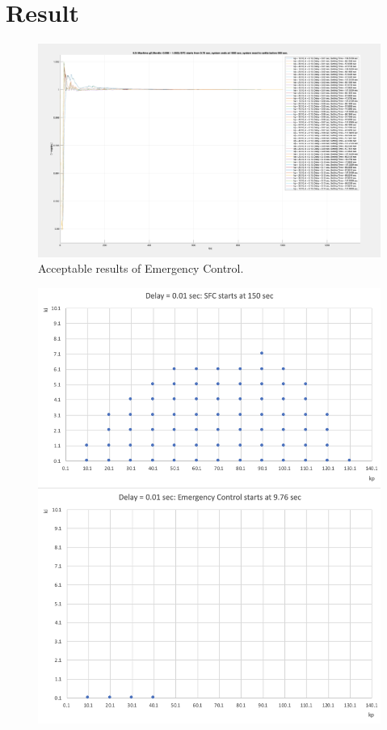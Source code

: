 \section{Result} %


\begin{figure}[htbp]
\centering
\includegraphics[width = .819\textwidth]{figure/6_4_i.png}
\caption{Acceptable results of Emergency Control.}
\label{6_4_i}
\end{figure}

\begin{figure}[htbp]
\centering
\includegraphics[width = .819\textwidth]{figure/6_4_copare_01.png}
\caption{}
\label{6_4_copare_01}
\end{figure}

